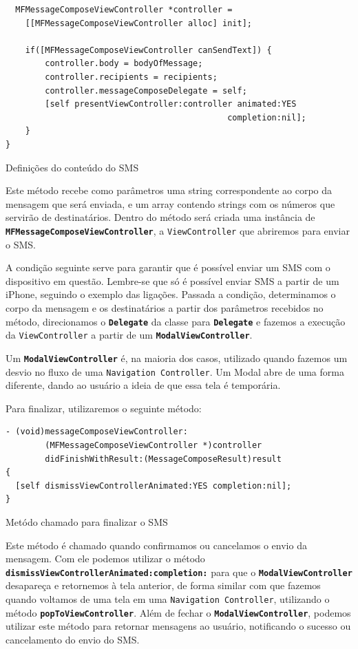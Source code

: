 \documentclass[a4paper,12pt,brazil,doubleside]{book}
\begin{document}
\begin{singlespace}
\begin{listing}[H]
\begin{verbatim}
  MFMessageComposeViewController *controller =
    [[MFMessageComposeViewController alloc] init];
    
    if([MFMessageComposeViewController canSendText]) {
        controller.body = bodyOfMessage;
        controller.recipients = recipients;
        controller.messageComposeDelegate = self;
        [self presentViewController:controller animated:YES
                                             completion:nil];
    }
}
\end{verbatim}
\caption{Definições do conteúdo do SMS}
\end{listing}


Este método recebe como parâmetros uma string correspondente ao corpo da mensagem que será enviada, e um array contendo strings com os números que servirão de destinatários. Dentro do método será criada uma instância de \texttt{\textbf{MFMessageComposeViewController}}, a \texttt{ViewController} que abriremos para enviar o SMS.

A condição seguinte serve para garantir que é possível enviar um SMS com o dispositivo em questão. Lembre-se que só é possível enviar SMS a partir de um iPhone, seguindo o exemplo das ligações. Passada a condição, determinamos o corpo da mensagem e os destinatários a partir dos parâmetros recebidos no método, direcionamos o \texttt{\textbf{Delegate}} da classe para \texttt{\textbf{Delegate}} e fazemos a execução da \texttt{ViewController} a partir de um \texttt{\textbf{ModalViewController}}.

Um \texttt{\textbf{ModalViewController}} é, na maioria dos casos, utilizado quando fazemos um desvio no fluxo de uma \texttt{Navigation Controller}. Um Modal abre de uma forma diferente, dando ao usuário a ideia de que essa tela é temporária.

Para finalizar, utilizaremos o seguinte método:

\begin{listing}[H]
\begin{verbatim}
- (void)messageComposeViewController:
        (MFMessageComposeViewController *)controller
        didFinishWithResult:(MessageComposeResult)result
{
  [self dismissViewControllerAnimated:YES completion:nil];  
}
\end{verbatim}
\caption{Metódo chamado para finalizar o SMS}
\end{listing}


Este método é chamado quando confirmamos ou cancelamos o envio da mensagem. Com ele podemos utilizar o método \texttt{\textbf{dismissViewControllerAnimated:completion:}} para que o \texttt{\textbf{ModalViewController}} desapareça e retornemos à tela anterior, de forma similar com que fazemos quando voltamos de uma tela em uma \texttt{Navigation Controller}, utilizando o método \texttt{\textbf{popToViewController}}. Além de fechar o \texttt{\textbf{ModalViewController}}, podemos utilizar este método para retornar mensagens ao usuário, notificando o sucesso ou cancelamento do envio do SMS.


\end{singlespace}
\end{document}
